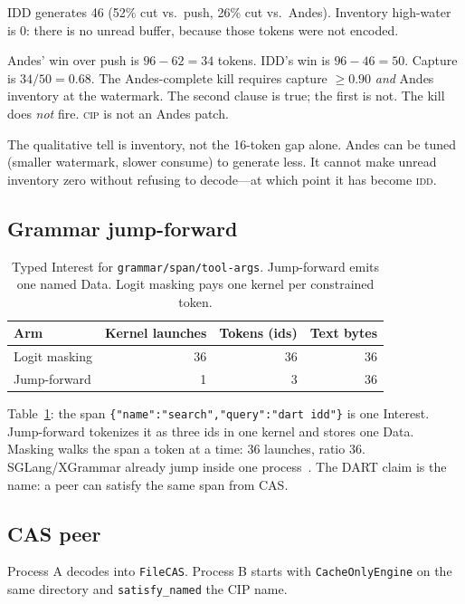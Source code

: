 \documentclass{article}
\theoremstyle{definition}
\newcommand{\cip}{\textsc{cip}}
\newcommand{\idd}{\textsc{idd}}
\begin{document}
IDD generates 46 (52\% cut vs.\ push, 26\% cut vs.\ Andes).
Inventory high-water is 0: there is no unread buffer, because those tokens were not encoded.

Andes' win over push is $96-62=34$ tokens.
IDD's win is $96-46=50$.
Capture is $34/50=0.68$.
The Andes-complete kill requires capture $\ge 0.90$ \emph{and} Andes inventory at the watermark.
The second clause is true; the first is not.
The kill does \emph{not} fire.
\cip{} is not an Andes patch.

The qualitative tell is inventory, not the 16-token gap alone.
Andes can be tuned (smaller watermark, slower consume) to generate less.
It cannot make unread inventory zero without refusing to decode---at which point it has become \idd{}.

\subsection{Grammar jump-forward}
\label{sec:grammar}

\begin{table}[t]
\centering
\small
\caption{Typed Interest for \texttt{grammar/span/tool-args}. Jump-forward emits one named Data. Logit masking pays one kernel per constrained token.}
\label{tab:grammar}
\begin{tabular}{lrrr}
\toprule
Arm & Kernel launches & Tokens (ids) & Text bytes \\
\midrule
Logit masking & 36 & 36 & 36 \\
Jump-forward & 1 & 3 & 36 \\
\bottomrule
\end{tabular}
\end{table}

Table~\ref{tab:grammar}: the span \texttt{\{"name":"search","query":"dart idd"\}} is one Interest.
Jump-forward tokenizes it as three ids in one kernel and stores one Data.
Masking walks the span a token at a time: 36 launches, ratio 36.
SGLang/XGrammar already jump inside one process~\citep{zheng2024sglang,dong2024xgrammar}.
The DART claim is the name: a peer can satisfy the same span from CAS.

\subsection{CAS peer}
\label{sec:cas}

Process A decodes into \texttt{FileCAS}.
Process B starts with \texttt{CacheOnlyEngine} on the same directory and \texttt{satisfy\_named} the CIP name.
\end{document}
